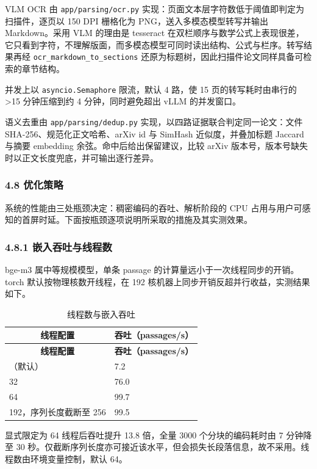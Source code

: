 \documentclass[UTF8,fontset=windows,zihao=5,a4paper]{ctexart}
\begin{document}
VLM OCR 由 \texttt{app/parsing/ocr.py} 实现：页面文本层字符数低于阈值即判定为扫描件，逐页以 150 DPI 栅格化为 PNG，送入多模态模型转写并输出 Markdown。采用 VLM 的理由是 tesseract 在双栏顺序与数学公式上表现很差，它只看到字符，不理解版面，而多模态模型可同时读出结构、公式与栏序。转写结果再经 \texttt{ocr\_\allowbreak{}markdown\_\allowbreak{}to\_\allowbreak{}sections} 还原为标题树，因此扫描件论文同样具备可检索的章节结构。

并发上以 \texttt{asyncio.Semaphore} 限流，默认 4 路，使 15 页的转写耗时由串行的 >15 分钟压缩到约 4 分钟，同时避免超出 vLLM 的并发窗口。

语义去重由 \texttt{app/parsing/dedup.py} 实现，以四路证据联合判定同一论文：文件 SHA-256、规范化正文哈希、arXiv id 与 SimHash 近似度，并叠加标题 Jaccard 与摘要 embedding 余弦。命中后给出保留建议，比较 arXiv 版本号，版本号缺失时以正文长度兜底，并可输出逐行差异。

\subsubsection*{4.8 优化策略}
系统的性能由三处瓶颈决定：稠密编码的吞吐、解析阶段的 CPU 占用与用户可感知的首屏时延。下面按瓶颈逐项说明所采取的措施及其实测效果。

\subsubsection*{4.8.1 嵌入吞吐与线程数}
bge-m3 属中等规模模型，单条 passage 的计算量远小于一次线程同步的开销。torch 默认按物理核数开线程，在 192 核机器上同步开销反超并行收益，实测结果如下。

\begin{longtable}{@{}p{}p{}@{}}
\caption{线程数与嵌入吞吐}\\
\toprule
\multicolumn{1}{c}{\textbf{线程配置}} & \multicolumn{1}{c}{\textbf{吞吐（passages/s）}} \\
\midrule
\endfirsthead
\toprule
\multicolumn{1}{c}{\textbf{线程配置}} & \multicolumn{1}{c}{\textbf{吞吐（passages/s）}} \\
\midrule
\endhead
\bottomrule
\endfoot
192（默认） & 7.2 \\
32 & 76.0 \\
64 & 99.7 \\
192，序列长度截断至 256 & 99.5 \\
\end{longtable}

显式限定为 64 线程后吞吐提升 13.8 倍，全量 3000 个分块的编码耗时由 7 分钟降至 30 秒。仅截断序列长度亦可接近该水平，但会损失长段落信息，故不采用。线程数由环境变量控制，默认 64。
\end{document}
